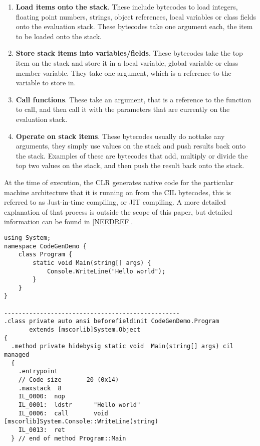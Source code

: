 	\begin{enumerate}
		\item \textbf{Load items onto the stack}. These include bytecodes to load
		integers, floating point numbers, strings, object references, local variables
		or class fields onto the evaluation stack. These bytecodes take one argument
		each, the item to be loaded onto the stack.
		
		\item \textbf{Store stack items into variables/fields}. These bytecodes take
		the top item on the stack and store it in a local variable, global variable
		or class member variable. They take one argument, which is a reference to the
		variable to store in.
		
		\item \textbf{Call functions}. These take an argument, that is a reference to
		the function to call, and then call it with the parameters that are currently 
		on the evaluation stack.
			
		\item \textbf{Operate on stack items}. These bytecodes usually do nottake any
		arguments, they simply use values on the stack and push results back onto the 
		stack. Examples of these are bytecodes that add, multiply or divide the top 
		two values on the stack, and then push the result back onto the stack.
		
	\end{enumerate}
	
	At the time of execution, the CLR generates native code for the particular 
	machine architecture that it is running on from the CIL bytecodes, this is 
	referred to as Just-in-time compiling, or JIT compiling. A more detailed 
	explanation of that process is outside the scope of this paper, but detailed
	information can be found in \ref{NEEDREF}.
	
\lstset{language=CSharp}
\lstset{commentstyle=\textit}
\begin{lstlisting}[frame=trbl]
using System;
namespace CodeGenDemo {
    class Program {
        static void Main(string[] args) {
            Console.WriteLine("Hello world");
        }
    }
}

-------------------------------------------------
.class private auto ansi beforefieldinit CodeGenDemo.Program
       extends [mscorlib]System.Object
{
  .method private hidebysig static void  Main(string[] args) cil managed
  {
    .entrypoint
    // Code size       20 (0x14)
    .maxstack  8
    IL_0000:  nop
    IL_0001:  ldstr      "Hello world"
    IL_0006:  call       void [mscorlib]System.Console::WriteLine(string)
    IL_0013:  ret
  } // end of method Program::Main
\end{lstlisting}
  
